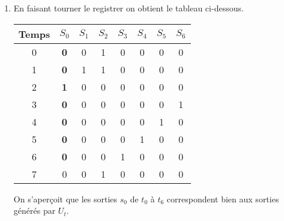 \documentclass[a4paper,10pt]{article}
\begin{document}
\begin{enumerate}
\newpage
\item
En faisant tourner le registrer on obtient le tableau ci-dessous.
\begin{table}[h]
		\centering
		\begin{tabular}{|c|c|c|c|c|c|c|c|}
			 \hline
			\textbf{Temps} & \textbf{$ S_0 $ }&\textbf{$ S_1 $} & \textbf{$ S_{2} $} & \textbf{$ S_{3} $}&\textbf{$ S_{4} $}&\textbf{$ S_{5} $}&\textbf{$ S_{6} $}\\ \hline
			0 &  \textbf{0} & 0& 1 & 0 & 0 & 0 & 0 \\ \hline
			1 &  \textbf{0} & 1& 1 & 0 & 0 & 0 & 0 \\ \hline
			2 &  \textbf{1} & 0& 0 & 0 & 0 & 0 & 0 \\ \hline
			3 &  \textbf{0} & 0& 0 & 0 & 0 & 0 & 1 \\ \hline
			4 &  \textbf{0} & 0& 0 & 0 & 0 & 1 & 0 \\ \hline
			5 &  \textbf{0} & 0& 0 & 0 & 1 & 0 & 0 \\ \hline
			6 &  \textbf{0} & 0& 0 & 1 & 0 & 0 & 0 \\ \hline
			7 & 0 & 0& 1 & 0 & 0 & 0 & 0 \\ \hline
		\end{tabular}
	\end{table}

On s'aperçoit que les sorties $s_0$ de $t_0$ à $t_6$ correspondent bien aux sorties générés par $U_t$.


\end{enumerate}
\end{document}
